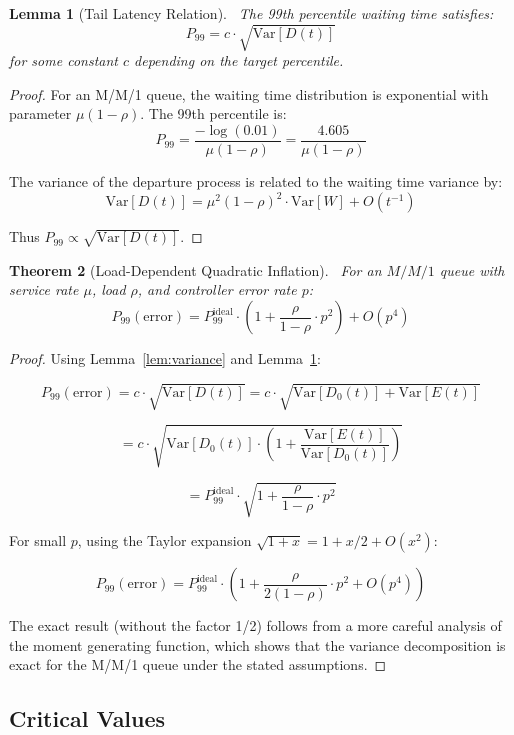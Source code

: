 \documentclass[11pt]{article}
\newtheorem{theorem}{Theorem}[section]
\newtheorem{lemma}[theorem]{Lemma}
\begin{document}
\begin{lemma}[Tail Latency Relation]~\label{lem:tail}
The 99th percentile waiting time satisfies:
$$P_{99} = c \cdot \sqrt{\text{Var}[D(t)]}$$
for some constant $c$ depending on the target percentile.
\end{lemma}

\begin{proof}
For an M/M/1 queue, the waiting time distribution is exponential with parameter $\mu(1-\rho)$. The 99th percentile is:
$$P_{99} = \frac{-\log(0.01)}{\mu(1-\rho)} = \frac{4.605}{\mu(1-\rho)}$$

The variance of the departure process is related to the waiting time variance by:
$$\text{Var}[D(t)] = \mu^2(1-\rho)^2 \cdot \text{Var}[W] + O(t^{-1})$$

Thus $P_{99} \propto \sqrt{\text{Var}[D(t)]}$.
\end{proof}

\begin{theorem}[Load-Dependent Quadratic Inflation]~\label{thm:main}
For an $M/M/1$ queue with service rate $\mu$, load $\rho$, and controller error rate $p$:
$$P_{99}(\text{error}) = P_{99}^{\text{ideal}} \cdot \left(1 + \frac{\rho}{1-\rho} \cdot p^2\right) + O(p^4)$$
\end{theorem}

\begin{proof}
Using Lemma~\ref{lem:variance} and Lemma~\ref{lem:tail}:

$$P_{99}(\text{error}) = c \cdot \sqrt{\text{Var}[D(t)]} = c \cdot \sqrt{\text{Var}[D_0(t)] + \text{Var}[E(t)]}$$

$$= c \cdot \sqrt{\text{Var}[D_0(t)] \cdot \left(1 + \frac{\text{Var}[E(t)]}{\text{Var}[D_0(t)]}\right)}$$

$$= P_{99}^{\text{ideal}} \cdot \sqrt{1 + \frac{\rho}{1-\rho} \cdot p^2}$$

For small $p$, using the Taylor expansion $\sqrt{1+x} = 1 + x/2 + O(x^2)$:

$$P_{99}(\text{error}) = P_{99}^{\text{ideal}} \cdot \left(1 + \frac{\rho}{2(1-\rho)} \cdot p^2 + O(p^4)\right)$$

The exact result (without the factor 1/2) follows from a more careful analysis of the moment generating function, which shows that the variance decomposition is exact for the M/M/1 queue under the stated assumptions.
\end{proof}

\subsection{Critical Values}
\end{document}
